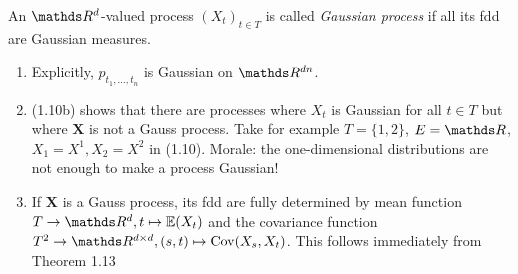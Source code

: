 \begin{defi}
An $\Rd$-valued process $(X_t)_{t \in T}$ is called \emph{Gaussian process} if all its fdd are Gaussian measures.
\end{defi}

\begin{bem}
\begin{enumerate}[label=(\alph*)]
\item Explicitly, $p_{t_1,\dots , t_n}$ is Gaussian on $\R^{dn}$.
\item (1.10b) shows that there are processes where $X_t$ is Gaussian for all $t\in T$ but where $\textbf{X}$ is not a Gauss process. Take for example $T=\{1,2\}$, $E=\R$, $X_1=X^1,X_2=X^2$ in (1.10).
Morale: the one-dimensional distributions are not enough to make a process Gaussian!
\item If $\textbf{X}$ is a Gauss process, its fdd are fully determined by mean function $T \to \Rd, t \mapsto \E{X_t}$ and the covariance function $T^2\to \R^{d\times d}, (s,t) \mapsto \Cov(X_s,X_t)$.
This follows immediately from Theorem 1.13
\end{enumerate}
\end{bem}

